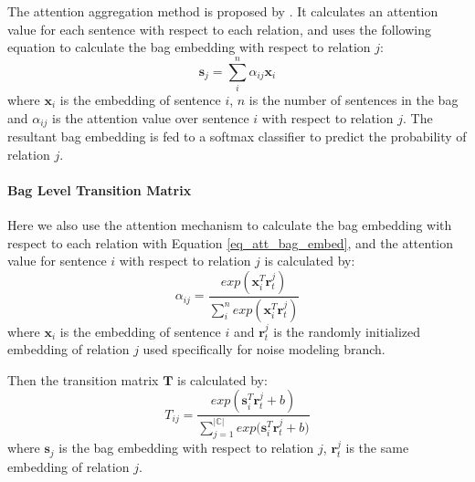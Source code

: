 The attention aggregation method is proposed by \cite{lin2016neural}. It calculates an attention value for each sentence with respect to each relation, and uses the following equation to calculate the bag embedding with respect to relation $j$:
\begin{equation}
\mathbf{s}_j = \sum_i^{n}{\alpha_{ij} \mathbf{x}_{i}}
\label{eq_att_bag_embed}
\end{equation}
where $\mathbf{x}_{i}$ is the embedding of sentence $i$, $n$ is the number of sentences in the bag and $\alpha_{ij}$ is the attention value over sentence $i$ with respect to relation $j$. The resultant bag embedding is fed to a softmax classifier to predict the probability of relation $j$.

\paragraph{Bag Level Transition Matrix}
 Here we also use the attention mechanism to calculate the bag embedding with respect to each relation with Equation \ref{eq_att_bag_embed}, and the attention value for sentence $i$ with respect to relation $j$ is calculated by:
\begin{equation}
\alpha_{ij} = \frac{exp(\mathbf{x}_i^T \mathbf{r}_t^j)}{\sum_i^n{exp(\mathbf{x}_i^T \mathbf{r}_t^j)}}
\end{equation}
where $\mathbf{x}_i$ is the embedding of sentence $i$ and $\mathbf{r}_t^j$ is the randomly initialized embedding of relation $j$ used specifically for noise modeling branch.

Then the transition matrix $\mathbf{T}$ is calculated by:
\begin{equation}
T_{ij} = \frac{exp({\mathbf{s}_i^T \mathbf{r}_t^j  + b})}{\sum_{j=1}^{|\mathbb{C}|}{exp(\mathbf{s}_i^T \mathbf{r}_t^j + b})}
\end{equation}
where $\mathbf{s}_j$ is the bag embedding with respect to relation $j$, $\mathbf{r}_t^j$ is the same embedding of relation $j$.



